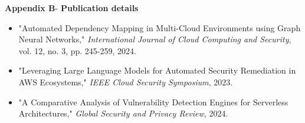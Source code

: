 \begin{center}
	{\Large \textbf{Appendix B}}-\vspace*{0.5 cm}
	{\Large \textbf{Publication details}}
\end{center}
\begin{center}
	\begin{itemize}
		\item "Automated Dependency Mapping in Multi-Cloud Environments using Graph Neural Networks," \textit{International Journal of Cloud Computing and Security}, vol. 12, no. 3, pp. 245-259, 2024.
		\item "Leveraging Large Language Models for Automated Security Remediation in AWS Ecosystems," \textit{IEEE Cloud Security Symposium}, 2023.
        \item "A Comparative Analysis of Vulnerability Detection Engines for Serverless Architectures," \textit{Global Security and Privacy Review}, 2024.
	\end{itemize}
	
\end{center}
